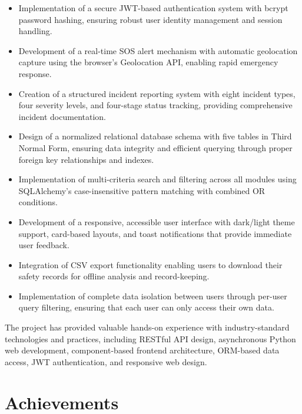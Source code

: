 \begin{itemize}
  \item Implementation of a secure JWT-based authentication system with bcrypt password hashing, ensuring robust user identity management and session handling.

  \item Development of a real-time SOS alert mechanism with automatic geolocation capture using the browser's Geolocation API, enabling rapid emergency response.

  \item Creation of a structured incident reporting system with eight incident types, four severity levels, and four-stage status tracking, providing comprehensive incident documentation.

  \item Design of a normalized relational database schema with five tables in Third Normal Form, ensuring data integrity and efficient querying through proper foreign key relationships and indexes.

  \item Implementation of multi-criteria search and filtering across all modules using SQLAlchemy's case-insensitive pattern matching with combined OR conditions.

  \item Development of a responsive, accessible user interface with dark/light theme support, card-based layouts, and toast notifications that provide immediate user feedback.

  \item Integration of CSV export functionality enabling users to download their safety records for offline analysis and record-keeping.

  \item Implementation of complete data isolation between users through per-user query filtering, ensuring that each user can only access their own data.
\end{itemize}

The project has provided valuable hands-on experience with industry-standard technologies and practices, including RESTful API design, asynchronous Python web development, component-based frontend architecture, ORM-based data access, JWT authentication, and responsive web design.

\section{Achievements}

